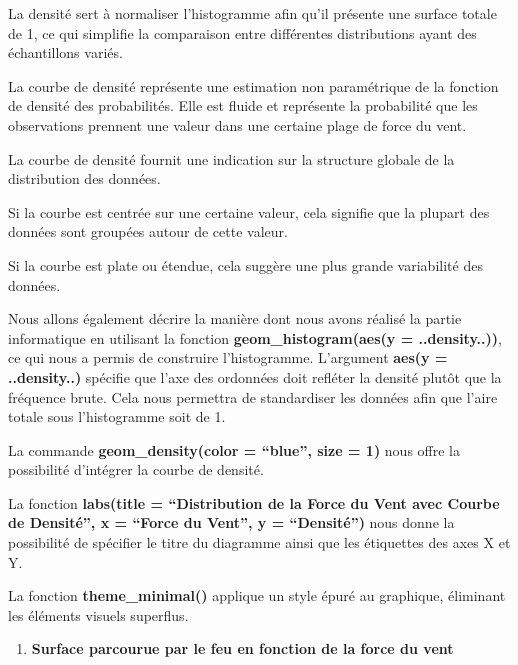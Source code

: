 \documentclass[
]{article}
\providecommand{\tightlist}{%
  \setlength{\itemsep}{0pt}\setlength{\parskip}{0pt}}
\begin{document}
La densité sert à normaliser l'histogramme afin qu'il présente une
surface totale de 1, ce qui simplifie la comparaison entre différentes
distributions ayant des échantillons variés.

La courbe de densité représente une estimation non paramétrique de la
fonction de densité des probabilités. Elle est fluide et représente la
probabilité que les observations prennent une valeur dans une certaine
plage de force du vent.

La courbe de densité fournit une indication sur la structure globale de
la distribution des données.

Si la courbe est centrée sur une certaine valeur, cela signifie que la
plupart des données sont groupées autour de cette valeur.

Si la courbe est plate ou étendue, cela suggère une plus grande
variabilité des données.

Nous allons également décrire la manière dont nous avons réalisé la
partie informatique en utilisant la fonction
\textbf{geom\_histogram(aes(y = ..density..))}, ce qui nous a permis de
construire l'histogramme. L'argument \textbf{aes(y = ..density..)}
spécifie que l'axe des ordonnées doit refléter la densité plutôt que la
fréquence brute. Cela nous permettra de standardiser les données afin
que l'aire totale sous l'histogramme soit de 1.

La commande \textbf{geom\_density(color = ``blue'', size = 1)} nous
offre la possibilité d'intégrer la courbe de densité.

La fonction \textbf{labs(title = ``Distribution de la Force du Vent avec
Courbe de Densité'', x = ``Force du Vent'', y = ``Densité'')} nous donne
la possibilité de spécifier le titre du diagramme ainsi que les
étiquettes des axes X et Y.

La fonction \textbf{theme\_minimal()} applique un style épuré au
graphique, éliminant les éléments visuels superflus.

\begin{enumerate}
\def\labelenumi{\arabic{enumi}.}
\setcounter{enumi}{1}
\tightlist
\item
  \textbf{Surface parcourue par le feu en fonction de la force du vent}
\end{enumerate}
\end{document}
